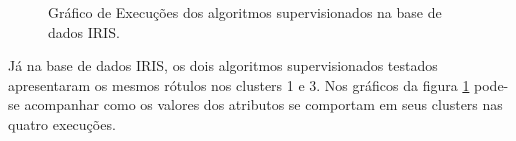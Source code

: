 \begin{figure}[h!]
    \centering
    \quad
    
    \caption{Gráfico de Execuções dos algoritmos supervisionados na base de dados IRIS.} \label{fig:graf:IRIS_NB_CART}
        
\end{figure}

Já na base de dados IRIS, os dois algoritmos supervisionados testados apresentaram os mesmos rótulos nos clusters 1 e 3. Nos gráficos da figura \ref{fig:graf:IRIS_NB_CART} pode-se acompanhar como os valores dos atributos se comportam em seus clusters nas quatro execuções. 

